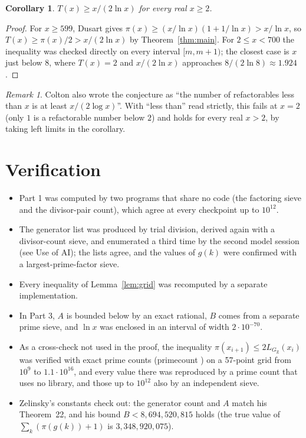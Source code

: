 \documentclass[11pt]{article}
\newtheorem{corollary}[theorem]{Corollary}
\theoremstyle{remark}
\newtheorem{remark}[theorem]{Remark}
\newcommand{\GZ}{G_{\mathrm{Z}}}
\begin{document}
\begin{corollary}
$T(x) \ge x/(2\ln x)$ for every real $x \ge 2$.
\end{corollary}

\begin{proof}
For $x \ge 599$, Dusart \cite[(6.5)]{Du10} gives $\pi(x) \ge (x/\ln x)(1 + 1/\ln x) > x/\ln x$, so $T(x) \ge \pi(x)/2 > x/(2\ln x)$ by Theorem~\ref{thm:main}. For $2 \le x < 700$ the inequality was checked directly on every interval $[m, m+1)$; the closest case is $x$ just below $8$, where $T(x) = 2$ and $x/(2\ln x)$ approaches $8/(2\ln 8) \approx 1.924$.
\end{proof}

\begin{remark}
Colton also wrote the conjecture as ``the number of refactorables less than $x$ is at least $x/(2\log x)$''. With ``less than'' read strictly, this fails at $x = 2$ (only $1$ is a refactorable number below $2$) and holds for every real $x > 2$, by taking left limits in the corollary.
\end{remark}

\section{Verification}

\begin{itemize}
\item Part 1 was computed by two programs that share no code (the factoring sieve and the divisor-pair count), which agree at every checkpoint up to $10^{12}$.
\item The generator list was produced by trial division, derived again with a divisor-count sieve, and enumerated a third time by the second model session (see Use of AI); the lists agree, and the values of $g(k)$ were confirmed with a largest-prime-factor sieve.
\item Every inequality of Lemma~\ref{lem:grid} was recomputed by a separate implementation.
\item In Part 3, $A$ is bounded below by an exact rational, $B$ comes from a separate prime sieve, and $\ln x$ was enclosed in an interval of width $2\cdot 10^{-70}$.
\item As a cross-check not used in the proof, the inequality $\pi(x_{i+1}) \le 2L_{\GZ}(x_i)$ was verified with exact prime counts (primecount \cite{Wa}) on a 57-point grid from $10^9$ to $1.1\cdot 10^{16}$, and every value there was reproduced by a prime count that uses no library, and those up to $10^{12}$ also by an independent sieve.
\item Zelinsky's constants check out: the generator count and $A$ match his Theorem~22, and his bound $B < 8{,}694{,}520{,}815$ holds (the true value of $\sum_{k} (\pi(g(k)) + 1)$ is $3{,}348{,}920{,}075$).
\end{itemize}
\end{document}
